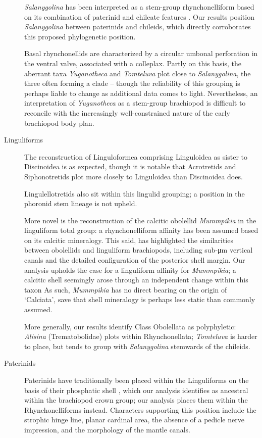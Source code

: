 \documentclass[openany]{book}
\theoremstyle{definition}
\theoremstyle{definition}
\theoremstyle{definition}
\theoremstyle{remark}
\begin{document}
\begin{description}
\emph{Salanygolina} has been interpreted as a stem-group
rhynchonelliform based on its combination of paterinid and chileate
features \citep{Holmer2009Theenigmatic}. Our results position
\emph{Salanygolina} between paterinids and chileids, which directly
corroborates this proposed phylogenetic position.

Basal rhynchonellids are characterized by a circular umbonal perforation
in the ventral valve, associated with a colleplax. Partly on this basis,
the aberrant taxa \emph{Yuganotheca} and \emph{Tomteluva} plot close to
\emph{Salanygolina}, the three often forming a clade -- though the
reliability of this grouping is perhaps liable to change as additional
data comes to light. Nevertheless, an interpretation of
\emph{Yuganotheca} as a stem-group brachiopod \citep{Zhang2014Anearly}
is difficult to reconcile with the increasingly well-constrained nature
of the early brachiopod body plan.
\item[Linguliforms]
The reconstruction of Linguloformea comprising Linguloidea as sister to
Discinoidea is as expected, though it is notable that Acrotretids and
Siphonotretids plot more closely to Linguloidea than Discinoidea does.

Lingulellotretids also sit within this lingulid grouping; a position in
the phoronid stem lineage \citep[advocated
by][]{Balthasar2009EarlyCambrian} is not upheld.

More novel is the reconstruction of the calcitic obolellid
\emph{Mummpikia} in the linguliform total group: a rhynchonelliform
affinity has been assumed based on its calcitic mineralogy. This said,
\citet{Balthasar2008iMummpikia} has highlighted the similarities between
obolellids and linguliform brachiopods, including sub-μm vertical canals
and the detailed configuration of the posterior shell margin. Our
analysis upholds the case for a linguliform affinity for
\emph{Mummpikia}; a calcitic shell seemingly arose through an
independent change within this taxon As such, \emph{Mummpikia} has no
direct bearing on the origin of `Calciata', save that shell mineralogy
is perhaps less static than commonly assumed.

More generally, our results identify Class Obolellata as polyphyletic:
\emph{Alisina} (Trematobolidae) plots within Rhynchonellata;
\emph{Tomteluva} is harder to place, but tends to group with
\emph{Salanygolina} stemwards of the chileids.
\item[Paterinids]
Paterinids have traditionally been placed within the Linguliforms on the
basis of their phosphatic shell \citep{Williams2007Supplement}, which
our analysis identifies as ancestral within the brachiopod crown group;
our analysis places them within the Rhynchonelliforms instead.
Characters supporting this position include the strophic hinge line,
planar cardinal area, the absence of a pedicle nerve impression, and the
morphology of the mantle canals.


\end{description}
\end{document}

